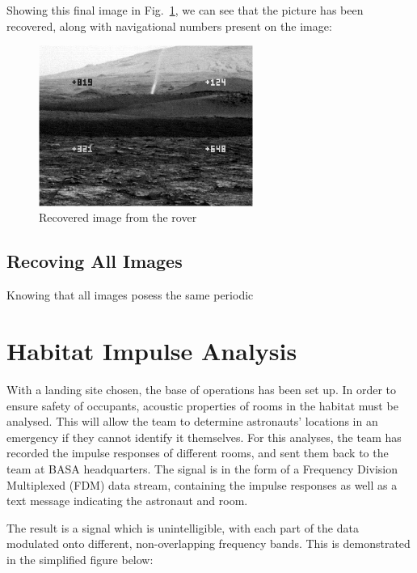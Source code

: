 \documentclass[12pt]{article}
\begin{document}
Showing this final image in Fig.~\ref{fig:p2-im1recov}, we can see that the
picture has been recovered, along with navigational numbers present on the
image:

\begin{figure}[ht]
    \centering
    \includegraphics[width=7cm]{figures/p2-im1recov.png}
    \caption{Recovered image from the rover\label{fig:p2-im1recov}}
\end{figure}

\subsection{Recoving All Images}
Knowing that all images posess the same periodic

%
%
\section{Habitat Impulse Analysis}
With a landing site chosen, the base of operations has been set up. In order to
ensure safety of occupants, acoustic properties of rooms in the habitat must be
analysed. This will allow the team to determine astronauts' locations in an
emergency if they cannot identify it themselves. For this analyses, the team
has recorded the impulse responses of different rooms, and sent them back to
the team at BASA headquarters. The signal is in the form of a Frequency
Division Multiplexed (FDM) data stream, containing the impulse responses as
well as a text message indicating the astronaut and room.

The result is a signal which is unintelligible, with each part of the data
modulated onto different, non-overlapping frequency bands. This is demonstrated
in the simplified figure below:
\end{document}
